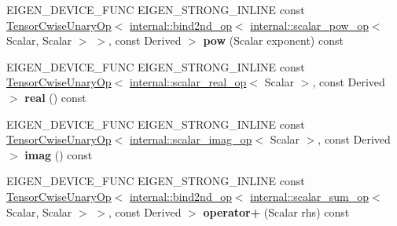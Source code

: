 \begin{DoxyCompactItemize}
E\+I\+G\+E\+N\+\_\+\+D\+E\+V\+I\+C\+E\+\_\+\+F\+U\+NC E\+I\+G\+E\+N\+\_\+\+S\+T\+R\+O\+N\+G\+\_\+\+I\+N\+L\+I\+NE const \hyperlink{class_eigen_1_1_tensor_cwise_unary_op}{Tensor\+Cwise\+Unary\+Op}$<$ \hyperlink{struct_eigen_1_1internal_1_1bind2nd__op}{internal\+::bind2nd\+\_\+op}$<$ \hyperlink{struct_eigen_1_1internal_1_1scalar__pow__op}{internal\+::scalar\+\_\+pow\+\_\+op}$<$ Scalar, Scalar $>$ $>$, const Derived $>$ {\bfseries pow} (Scalar exponent) const
\item 
\mbox{\label{class_eigen_1_1_tensor_base_3_01_derived_00_01_read_only_accessors_01_4_a39d880af6e618792e3cb2b56498964d3}} 
E\+I\+G\+E\+N\+\_\+\+D\+E\+V\+I\+C\+E\+\_\+\+F\+U\+NC E\+I\+G\+E\+N\+\_\+\+S\+T\+R\+O\+N\+G\+\_\+\+I\+N\+L\+I\+NE const \hyperlink{class_eigen_1_1_tensor_cwise_unary_op}{Tensor\+Cwise\+Unary\+Op}$<$ \hyperlink{struct_eigen_1_1internal_1_1scalar__real__op}{internal\+::scalar\+\_\+real\+\_\+op}$<$ Scalar $>$, const Derived $>$ {\bfseries real} () const
\item 
\mbox{\label{class_eigen_1_1_tensor_base_3_01_derived_00_01_read_only_accessors_01_4_a0c243f6901a69a6445aa07322dd31002}} 
E\+I\+G\+E\+N\+\_\+\+D\+E\+V\+I\+C\+E\+\_\+\+F\+U\+NC E\+I\+G\+E\+N\+\_\+\+S\+T\+R\+O\+N\+G\+\_\+\+I\+N\+L\+I\+NE const \hyperlink{class_eigen_1_1_tensor_cwise_unary_op}{Tensor\+Cwise\+Unary\+Op}$<$ \hyperlink{struct_eigen_1_1internal_1_1scalar__imag__op}{internal\+::scalar\+\_\+imag\+\_\+op}$<$ Scalar $>$, const Derived $>$ {\bfseries imag} () const
\item 
\mbox{\label{class_eigen_1_1_tensor_base_3_01_derived_00_01_read_only_accessors_01_4_a61e6e0e87049a985e8721d9c2a3eeb95}} 
E\+I\+G\+E\+N\+\_\+\+D\+E\+V\+I\+C\+E\+\_\+\+F\+U\+NC E\+I\+G\+E\+N\+\_\+\+S\+T\+R\+O\+N\+G\+\_\+\+I\+N\+L\+I\+NE const \hyperlink{class_eigen_1_1_tensor_cwise_unary_op}{Tensor\+Cwise\+Unary\+Op}$<$ \hyperlink{struct_eigen_1_1internal_1_1bind2nd__op}{internal\+::bind2nd\+\_\+op}$<$ \hyperlink{struct_eigen_1_1internal_1_1scalar__sum__op}{internal\+::scalar\+\_\+sum\+\_\+op}$<$ Scalar, Scalar $>$ $>$, const Derived $>$ {\bfseries operator+} (Scalar rhs) const
\item 
\mbox{\label{class_eigen_1_1_tensor_base_3_01_derived_00_01_read_only_accessors_01_4_a19991dd37d533f6856c6ad5cb380a3ed}} 

\end{DoxyCompactItemize}
